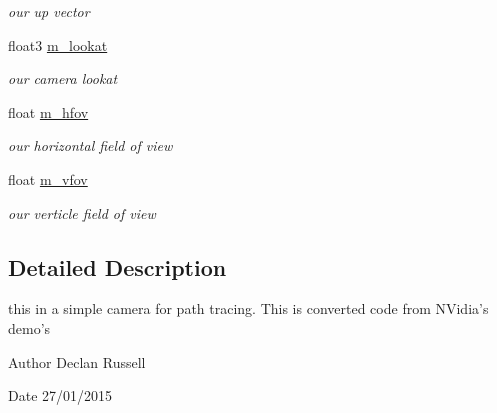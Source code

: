 \begin{DoxyCompactItemize}
\begin{DoxyCompactList}\small\item\em our up vector \end{DoxyCompactList}\item 
\hypertarget{class_path_trace_camera_ad4170b243891e25eb7f3e3e448a5f191}{float3 \hyperlink{class_path_trace_camera_ad4170b243891e25eb7f3e3e448a5f191}{m\-\_\-lookat}}\label{class_path_trace_camera_ad4170b243891e25eb7f3e3e448a5f191}

\begin{DoxyCompactList}\small\item\em our camera lookat \end{DoxyCompactList}\item 
\hypertarget{class_path_trace_camera_ae09bd8e6770a93c72c82fbf9e5b1e73e}{float \hyperlink{class_path_trace_camera_ae09bd8e6770a93c72c82fbf9e5b1e73e}{m\-\_\-hfov}}\label{class_path_trace_camera_ae09bd8e6770a93c72c82fbf9e5b1e73e}

\begin{DoxyCompactList}\small\item\em our horizontal field of view \end{DoxyCompactList}\item 
\hypertarget{class_path_trace_camera_aaea87e102ae515b1b73b6f98e6b8937c}{float \hyperlink{class_path_trace_camera_aaea87e102ae515b1b73b6f98e6b8937c}{m\-\_\-vfov}}\label{class_path_trace_camera_aaea87e102ae515b1b73b6f98e6b8937c}

\begin{DoxyCompactList}\small\item\em our verticle field of view \end{DoxyCompactList}\end{DoxyCompactItemize}


\subsection{Detailed Description}
this in a simple camera for path tracing. This is converted code from N\-Vidia's demo's 

\begin{DoxyAuthor}{Author}
Declan Russell 
\end{DoxyAuthor}
\begin{DoxyDate}{Date}
27/01/2015 
\end{DoxyDate}


